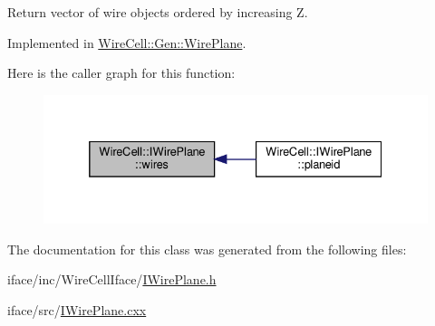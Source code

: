 Return vector of wire objects ordered by increasing Z. 



Implemented in \hyperlink{class_wire_cell_1_1_gen_1_1_wire_plane_aabd90e5ca70c31d41015980d7f320abe}{Wire\+Cell\+::\+Gen\+::\+Wire\+Plane}.

Here is the caller graph for this function\+:
\nopagebreak
\begin{figure}[H]
\begin{center}
\leavevmode
\includegraphics[width=332pt]{class_wire_cell_1_1_i_wire_plane_ad5f6668d7faefcd895daf602dc60be1a_icgraph}
\end{center}
\end{figure}


The documentation for this class was generated from the following files\+:\begin{DoxyCompactItemize}
\item 
iface/inc/\+Wire\+Cell\+Iface/\hyperlink{_i_wire_plane_8h}{I\+Wire\+Plane.\+h}\item 
iface/src/\hyperlink{_i_wire_plane_8cxx}{I\+Wire\+Plane.\+cxx}\end{DoxyCompactItemize}
